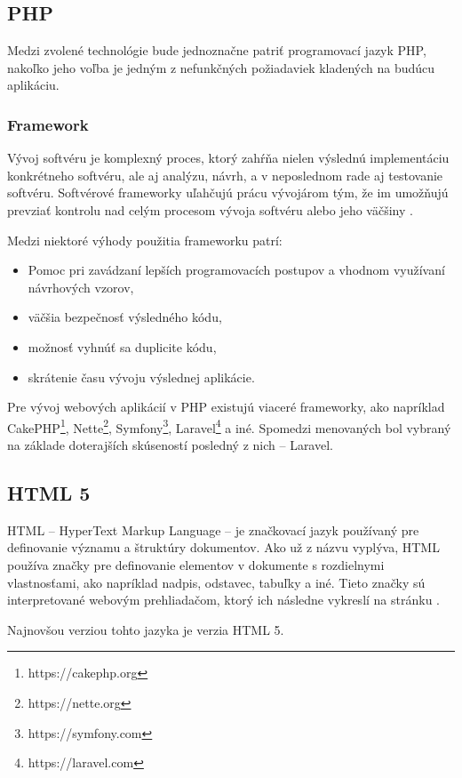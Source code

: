 \subsection{PHP}
Medzi zvolené technológie bude jednoznačne patriť programovací jazyk PHP, nakoľko jeho voľba je jedným z nefunkčných požiadaviek kladených na budúcu aplikáciu. 

\subsubsection*{Framework}
Vývoj softvéru je komplexný proces, ktorý zahŕňa nielen výslednú implementáciu konkrétneho softvéru, ale aj analýzu, návrh, a v neposlednom rade aj testovanie softvéru. Softvérové frameworky uľahčujú prácu vývojárom tým, že im umožňujú prevziať kontrolu nad celým procesom vývoja softvéru alebo jeho väčšiny \cite{co-je-framework}.

Medzi niektoré výhody použitia frameworku patrí:

\begin{itemize}
	\item Pomoc pri zavádzaní lepších programovacích postupov a vhodnom využívaní návrhových vzorov,
	\item väčšia bezpečnosť výsledného kódu,
	\item možnosť vyhnúť sa duplicite kódu,
	\item skrátenie času vývoju výslednej aplikácie.
\end{itemize}

Pre vývoj webových aplikácií v PHP existujú viaceré frameworky, ako napríklad CakePHP\footnote{https://cakephp.org}, Nette\footnote{https://nette.org}, Symfony\footnote{https://symfony.com}, Laravel\footnote{https://laravel.com} a iné.
Spomedzi menovaných bol vybraný na základe doterajších skúseností posledný z nich -- Laravel.

\subsection{HTML 5}
HTML -- HyperText Markup Language -- je značkovací jazyk používaný pre definovanie významu a štruktúry dokumentov. Ako už z názvu vyplýva, HTML používa značky pre definovanie elementov v dokumente s rozdielnymi vlastnosťami, ako napríklad nadpis, odstavec, tabuľky a iné.
Tieto značky sú interpretované webovým prehliadačom, ktorý ich následne vykreslí na stránku \cite{co-je-html}.

Najnovšou verziou tohto jazyka je verzia HTML 5.

